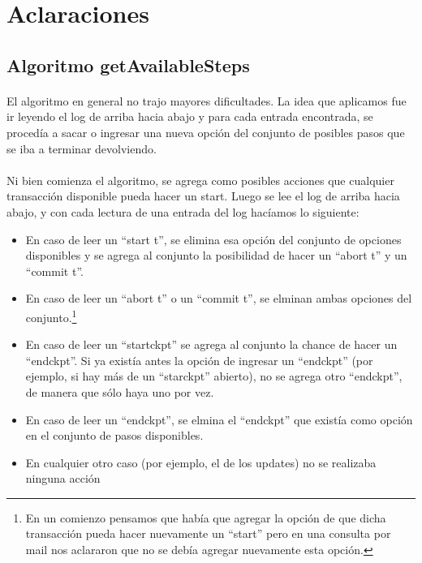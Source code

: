 \documentclass[11pt, a4paper]{article}
\begin{document}
	\maketitle


\section{Aclaraciones}

\subsection{Algoritmo getAvailableSteps}
\paragraph{}
El algoritmo en general no trajo mayores dificultades. La idea que aplicamos fue ir leyendo el log de arriba hacia abajo y para cada entrada encontrada, se procedía a sacar o ingresar una nueva opción del conjunto de posibles pasos que se iba a terminar devolviendo.
\paragraph{}
Ni bien comienza el algoritmo, se agrega como posibles acciones que cualquier transacción disponible pueda hacer un start. Luego se lee el log de arriba hacia abajo, y con cada lectura de una entrada del log hacíamos lo siguiente:
\begin{itemize}
	\item En caso de leer un ``start t'', se elimina esa opción del conjunto de opciones disponibles y se agrega al conjunto la posibilidad de hacer un ``abort t'' y un ``commit t''.
	\item En caso de leer un ``abort t'' o un ``commit t'', se elminan ambas opciones del conjunto.\footnote{En un comienzo pensamos que había que agregar la opción de que dicha transacción pueda hacer nuevamente un ``start'' pero en una consulta por mail nos aclararon que no se debía agregar nuevamente esta opción.}
	\item En caso de leer un ``startckpt'' se agrega al conjunto la chance de hacer un ``endckpt''. Si ya existía antes la opción de ingresar un ``endckpt'' (por ejemplo, si hay más de un ``starckpt'' abierto), no se agrega otro ``endckpt'', de manera que sólo haya uno por vez.
	\item En caso de leer un ``endckpt'', se elmina el ``endckpt'' que existía como opción en el conjunto de pasos disponibles.
	\item En cualquier otro caso (por ejemplo, el de los updates) no se realizaba ninguna acción
\end{itemize}
\end{document}
